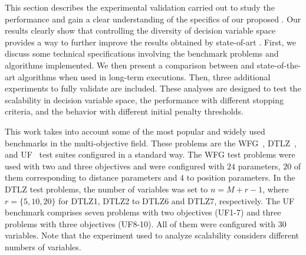 This section describes the experimental validation carried out to study the performance and
gain a clear understanding of the specifics of our proposed \VSDMOEA{}.
%
Our results clearly show that controlling the diversity of decision variable space provides a way to further improve the results 
obtained by state-of-art \MOEAS{}.
%
First, we discuss some technical specifications involving the benchmark problems and algorithms implemented.
%
We then present a comparison between \VSDMOEA{} and state-of-the-art algorithms when used in long-term executions.
%
Then, three additional experiments to fully validate \VSDMOEA{} are included.
%
These analyses are designed to test the scalability in decision variable space, the performance with different stopping criteria, 
and the behavior with different initial penalty thresholds.

This work takes into account some of the most popular and widely used benchmarks in the multi-objective field.
%
These problems are the WFG~\cite{Joel:WFG}, DTLZ~\cite{Joel:DTLZ}, and UF~\cite{Joel:CEC2009} test suites 
configured in a standard way.
%
The WFG test problems were used with two and three objectives and 
were configured with $24$ parameters, $20$ of them corresponding to distance parameters and $4$ to position parameters.
%
In the DTLZ test problems, the number of variables was set to $n=M+r-1$, where $r=\{5, 10, 20\}$ for DTLZ1, DTLZ2 to DTLZ6 and DTLZ7, respectively.
% 
The UF benchmark comprises seven problems with two objectives (UF1-7) and three problems with three objectives (UF8-10).
%
All of them were configured with $30$ variables.
%
Note that the experiment used to analyze scalability considers different numbers of variables.

